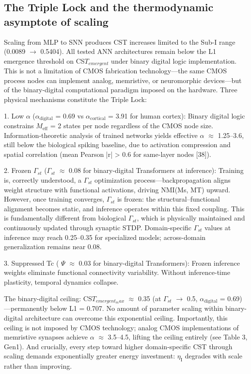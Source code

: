 \documentclass[a4paper,12pt]{article}
\begin{document}
\subsection{The Triple Lock and the thermodynamic asymptote of scaling}

Scaling from MLP to SNN produces CST increases limited to the Sub-I range (0.0089  $\rightarrow$  0.5404).
All tested ANN architectures remain below the L1 emergence threshold on CS$T_{emergent}$ under binary digital logic implementation.
This is not a limitation of CMOS fabrication technology---the same CMOS process nodes can implement analog, memristive, or neuromorphic devices---but of the binary-digital computational paradigm imposed on the hardware.
Three physical mechanisms constitute the Triple Lock:

1. Low  $\alpha$  ($\alpha_{\text{digital}}$ = 0.69 vs $\alpha_{\text{cortical}}$ = 3.91 for human cortex): Binary digital logic constrains $M_{\text{eff}}$ = 2 states per node regardless of the CMOS node size. Information-theoretic analysis of trained networks yields effective  $\alpha$   $\approx$  1.25--3.6, still below the biological spiking baseline, due to activation compression and spatial correlation (mean Pearson |r| > 0.6 for same-layer nodes [38]).

2.
Frozen $\Gamma_{st}$ ($\Gamma_{st}$  $\approx$  0.08 for binary-digital Transformers at inference): Training is, correctly understood, a $\Gamma_{st}$ optimization process---backpropagation aligns weight structure with functional activations, driving NMI(Ms, MT) upward.
However, once training converges, $\Gamma_{st}$ is frozen: the structural--functional alignment becomes static, and inference operates within this fixed coupling.
This is fundamentally different from biological $\Gamma_{st}$, which is physically maintained and continuously updated through synaptic STDP.
Domain-specific $\Gamma_{st}$ values at inference may reach 0.25--0.35 for specialized models; across-domain generalization remains near 0.08.

3. Suppressed Tc ( $\Psi$   $\approx$  0.03 for binary-digital Transformers): Frozen inference weights eliminate functional connectivity variability. Without inference-time plasticity, temporal dynamics collapse.

The binary-digital ceiling: CS$T_{emergent_max}$  $\approx$  0.35 (at $\Gamma_{st}$  $\rightarrow$  0.5, $\alpha_{\text{digital}}$ = 0.69)---permanently below L1 = 0.707.
No amount of parameter scaling within binary-digital architecture can overcome this exponential ceiling.
Importantly, this ceiling is not imposed by CMOS technology; analog CMOS implementations of memristive synapses achieve  $\alpha$   $\approx$  3.5--4.5, lifting the ceiling entirely (see Table 3, Gen1).
And crucially, every step toward higher domain-specific CST through scaling demands exponentially greater energy investment: $\eta_{\text{I}}$ degrades with scale rather than improving.
\end{document}
